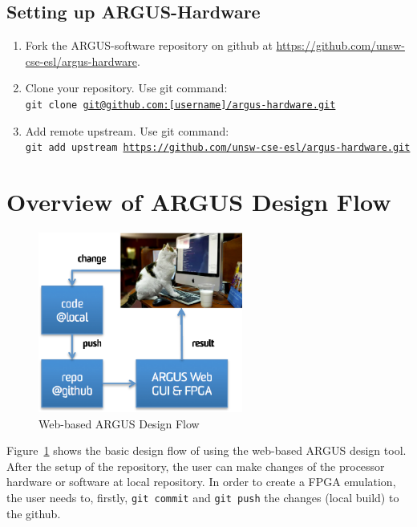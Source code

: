 \documentclass[a4paper,10pt]{article}
\begin{document}
\subsection{Setting up ARGUS-Hardware}\label{sec-ARGHW}
\begin{enumerate}
\item Fork the ARGUS-software repository on github at \url{https://github.com/unsw-cse-esl/argus-hardware}.
\item Clone your repository. Use git command:\\ 
\texttt{git clone \url{git@github.com:[username]/argus-hardware.git}}
\item Add remote upstream. Use git command:\\
\texttt{git add upstream \url{https://github.com/unsw-cse-esl/argus-hardware.git}}
\end{enumerate}



\newpage

\section{Overview of ARGUS Design Flow}

\begin{figure}[tb]
\centering
\includegraphics[width=0.6\textwidth]{fig/design-flow.eps}
\caption{Web-based ARGUS Design Flow}\label{fig-designflow}
\end{figure}

Figure~\ref{fig-designflow} shows the basic design flow of using the web-based ARGUS design tool. After the setup of the repository, the user can make changes of the processor hardware or software at local repository. In order to create a FPGA emulation, the user needs to, firstly, \texttt{git commit} and \texttt{git push} the changes (local build) to the github. 
\end{document}
